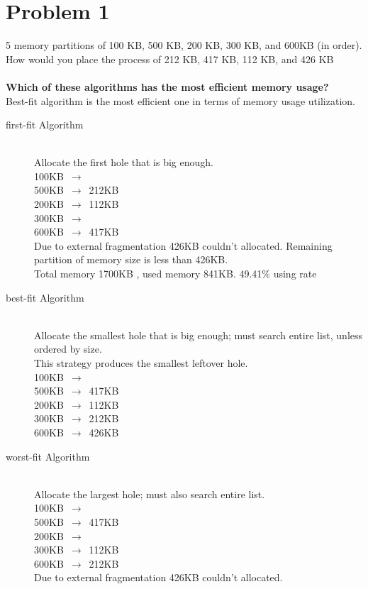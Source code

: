 \documentclass{article}
\begin{document}
\section{Problem 1}
5 memory partitions of 100 KB, 500 KB, 200 KB, 300 KB, and 600KB (in order).
 How would you place the process of 212 KB, 417 KB, 112 KB, and 426 KB
\\
\\ \textbf{Which of these algorithms has the most efficient memory usage?}
\\ Best-fit algorithm is the most efficient one in terms of memory usage utilization.
\begin{description}
    \item[first-fit Algorithm] \hfill \\
    Allocate the first hole that is big enough.
    \\ 100KB $\,\to\,$ 
    \\ 500KB $\,\to\,$ 212KB
    \\ 200KB $\,\to\,$ 112KB
    \\ 300KB $\,\to\,$
    \\ 600KB $\,\to\,$ 417KB
    \\ Due to external fragmentation 426KB couldn't allocated.
    Remaining partition of memory size is less than 426KB.
    \\ Total memory 1700KB , used memory 841KB. 49.41\% using rate
     \item[best-fit Algorithm] \hfill \\
    Allocate the smallest hole that is big enough; must search entire list, unless ordered by size.
    \\This strategy produces the smallest leftover hole.
    \\ 100KB $\,\to\,$
    \\ 500KB $\,\to\,$ 417KB
    \\ 200KB $\,\to\,$ 112KB
    \\ 300KB $\,\to\,$ 212KB
    \\ 600KB $\,\to\,$ 426KB
    \newpage
    \item[worst-fit Algorithm] \hfill \\
    Allocate the largest hole; must also search entire list.
    \\ 100KB $\,\to\,$ 
    \\ 500KB $\,\to\,$ 417KB
    \\ 200KB $\,\to\,$ 
    \\ 300KB $\,\to\,$ 112KB
    \\ 600KB $\,\to\,$ 212KB
    \\ Due to external fragmentation 426KB couldn't allocated.
\end{description}
\end{document}
